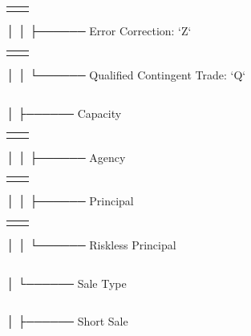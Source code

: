 \documentclass[11pt]{article}
\begin{document}
\begin{center}
\begin{tabular}{ll}
 & \\[0pt]
\end{tabular}
\end{center}
│       │       ├────── Error Correction: `Z`
\begin{center}
\begin{tabular}{ll}
 & \\[0pt]
\end{tabular}
\end{center}
│       │       └────── Qualified Contingent Trade: `Q`
\begin{center}
\begin{tabular}{l}
\\[0pt]
\end{tabular}
\end{center}
│       ├────── Capacity
\begin{center}
\begin{tabular}{ll}
 & \\[0pt]
\end{tabular}
\end{center}
│       │   ├────── Agency
\begin{center}
\begin{tabular}{ll}
 & \\[0pt]
\end{tabular}
\end{center}
│       │   ├────── Principal
\begin{center}
\begin{tabular}{ll}
 & \\[0pt]
\end{tabular}
\end{center}
│       │   └────── Riskless Principal
\begin{center}
\begin{tabular}{l}
\\[0pt]
\end{tabular}
\end{center}
│       └────── Sale Type
\begin{center}
\begin{tabular}{l}
\\[0pt]
\end{tabular}
\end{center}
│           ├────── Short Sale
\begin{center}
\begin{tabular}{l}
\\[0pt]
\end{tabular}
\end{center}
\end{document}
